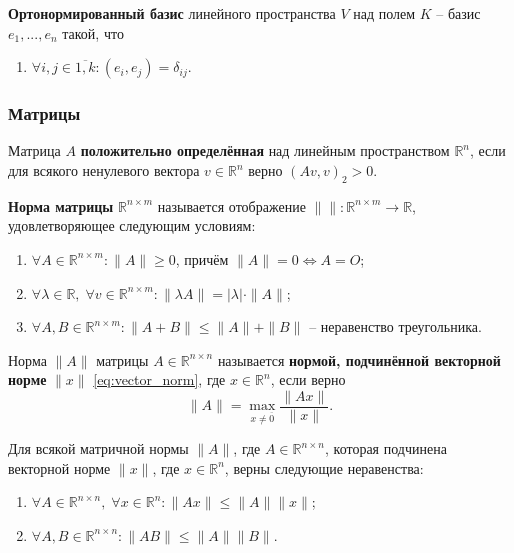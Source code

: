 \documentclass{article}
\begin{document}
\begin{define}
	\textbf{Ортонормированный базис} линейного пространства $V$ над полем
	$K$ -- базис $e_1,...,e_n$ такой, что
	\begin{enumerate}[nosep]
		\item $\forall i,j\in\overline{1,k}: (e_i,e_j)=\delta_{ij}$.
	\end{enumerate}
\end{define}

\subsubsection{Матрицы}
\begin{define}
	Матрица $A$ \textbf{положительно определённая} над линейным
	пространством $\mathbb R^n$, если для всякого ненулевого вектора
	$v\in \mathbb R^n$ верно $(Av, v)_2>0$.
\end{define}

\begin{define}
	\textbf{Норма матрицы} $\mathbb R^{n\times m}$
	называется отображение $\|\|: \mathbb R^{n\times m}\rightarrow
	\mathbb R$, удовлетворяющее следующим условиям:
	\begin{enumerate}[nosep]
		\item $\forall A\in\mathbb R^{n\times m}: \|A\|\ge 0$, причём
			$\|A\|=0\Leftrightarrow A=O$;
		\item $\forall \lambda\in \mathbb R,\;\forall v\in
			\mathbb R^{n\times m}:
			\|\lambda A\|=|\lambda|\cdot\|A\|$;
		\item $\forall A,B\in\mathbb R^{n\times m}: \|A+B\|\le\|A\|+\|B\|$ --
			неравенство треугольника.
	\end{enumerate}
\end{define}

\begin{define}
	Норма $\|A\|$ матрицы $A\in \mathbb R^{n\times n}$ называется
	\textbf{нормой, подчинённой векторной норме} $\|x\|$
	\eqref{eq:vector_norm}, где $x\in \mathbb R^n$, если верно
	\[\|A\|=\max_{x\ne \overline{0}}\frac{\|Ax\|}{\|x\|}.\]
\end{define}

\begin{lemma}\label{eq:subordinate_norm_properties}
	Для всякой матричной нормы $\|A\|$, где $A\in\mathbb R^{n\times n}$,
	которая подчинена векторной норме $\|x\|$, где $x\in\mathbb R^n$, верны
	следующие неравенства:
	\begin{enumerate}[nosep]
		\item $\forall A\in\mathbb R^{n\times n},\;\forall x\in\mathbb
			R^n: \|Ax\|\le\|A\|\|x\|$;
		\item $\forall A,B\in\mathbb R^{n\times n}:
			\|AB\|\le\|A\|\|B\|$.
	\end{enumerate}
\end{lemma}
\end{document}
